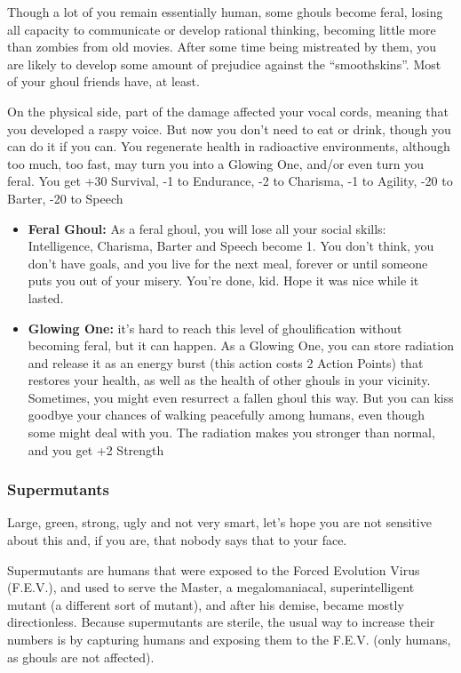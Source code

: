 \documentclass[11pt]{article} %
\begin{document}
Though a lot of you remain essentially human, some ghouls become feral, losing all capacity to communicate or develop rational thinking, becoming little more than zombies from old movies. After some time being mistreated by them, you are likely to develop some amount of prejudice against the ``smoothskins''. Most of your ghoul friends have, at least.

On the physical side, part of the damage affected your vocal cords, meaning that you developed a raspy voice. But now you don't need to eat or drink, though you can do it if you can. You regenerate health in radioactive environments, although too much, too fast, may turn you into a Glowing One, and/or even turn you feral. You get +30 Survival, -1 to Endurance, -2 to Charisma, -1 to Agility, -20 to Barter, -20 to Speech
\begin{itemize}
\item \textbf{Feral Ghoul:} As a feral ghoul, you will lose all your social skills: Intelligence, Charisma, Barter and Speech become 1. You don't think, you don't have goals, and you live for the next meal, forever or until someone puts you out of your misery. You're done, kid. Hope it was nice while it lasted.
\item \textbf{Glowing One:} it's hard to reach this level of ghoulification without becoming feral, but it can happen. As a Glowing One, you can store radiation and release it as an energy burst (this action costs 2 Action Points) that restores your health, as well as the health of other ghouls in your vicinity. Sometimes, you might even resurrect a fallen ghoul this way. But you can kiss goodbye your chances of walking peacefully among humans, even though some might deal with you. The radiation makes you stronger than normal, and you get +2 Strength
\end{itemize}

\subsubsection{Supermutants} 

Large, green, strong, ugly and not very smart, let's hope you are not sensitive about this and, if you are, that nobody says that to your face. 

Supermutants are humans that were exposed to the Forced Evolution Virus (F.E.V.), and used to serve the Master, a megalomaniacal, superintelligent mutant (a different sort of mutant), and after his demise, became mostly directionless. Because supermutants are sterile, the usual way to increase their numbers is by capturing humans and exposing them to the F.E.V. (only humans, as ghouls are not affected). 
\end{document}
